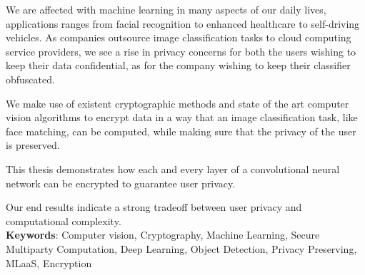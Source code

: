We are affected with machine learning in many aspects of our daily lives, applications ranges from facial recognition to enhanced healthcare to self-driving vehicles. As companies outsource image classification tasks to cloud computing service providers, we see a rise in privacy concerns for both the users wishing to keep their data confidential, as for the company wishing to keep their classifier obfuscated.

We make use of existent cryptographic methods and state of the art computer vision algorithms to encrypt data in a way that an image classification task, like face matching, can be computed, while making sure that the privacy of the user is preserved.

This thesis demonstrates how each and every layer of a convolutional neural network can be encrypted to guarantee user privacy.

Our end results indicate a strong tradeoff between user privacy and computational complexity.\\

\textbf{Keywords}: Computer vision, Cryptography, Machine Learning, Secure Multiparty Computation, Deep Learning, Object Detection, Privacy Preserving, MLaaS, Encryption
